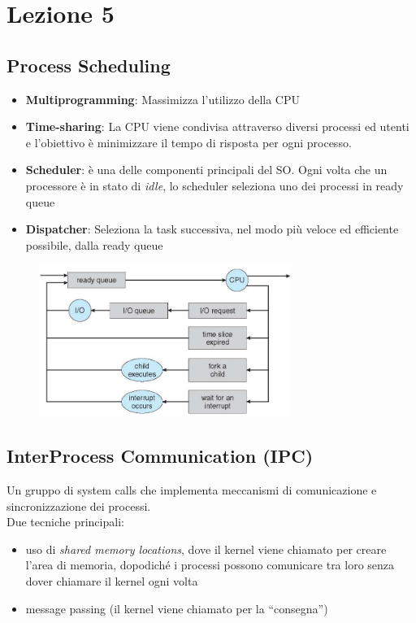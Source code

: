 \documentclass[12pt, a4paper]{article}
\begin{document}
	
	\section*{Lezione 5}
	
	\subsection*{Process Scheduling} 
	\begin{itemize}
		\item \textbf{Multiprogramming}: Massimizza l'utilizzo della CPU
		\item \textbf{Time-sharing}: La CPU viene condivisa attraverso diversi processi ed utenti e l'obiettivo è minimizzare il tempo di risposta per ogni processo.
		\item \textbf{Scheduler}: è una delle componenti principali del SO. Ogni volta che un processore è in stato di \textit{idle}, lo scheduler seleziona uno dei processi in ready queue
		\item \textbf{Dispatcher}: Seleziona la task successiva, nel modo più veloce ed efficiente possibile, dalla ready queue
	\end{itemize}

	\begin{figure}[!htbp]
		\centering
		\includegraphics[width=8.2cm]{SO_PNGs/queueing-diagram_SO.png}
		\caption*{}
		\label{fig:queueing-diagram}
	\end{figure}
	

	\subsection*{InterProcess Communication (IPC)} 
	Un gruppo di system calls che implementa meccanismi di comunicazione e sincronizzazione dei processi. \\
	Due tecniche principali:
	\begin{itemize}
		\item uso di \textit{shared memory locations}, dove il kernel viene chiamato per creare l'area di memoria, dopodiché i processi possono comunicare tra loro senza dover chiamare il kernel ogni volta
		\item message passing (il kernel viene chiamato per la ``consegna'')
	\end{itemize}
\end{document}
